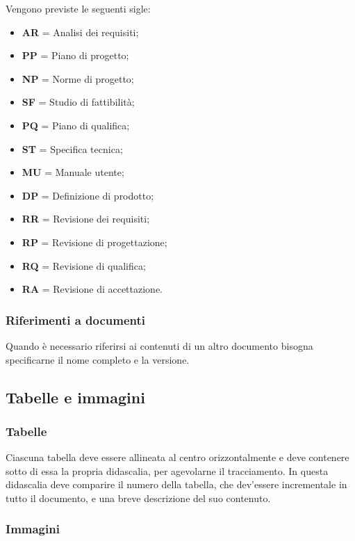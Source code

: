 	Vengono previste le seguenti sigle:
	
	\begin{itemize}

		\item \textbf{AR} = Analisi dei requisiti;
		\item \textbf{PP} = Piano di progetto;
		\item \textbf{NP} = Norme di progetto;
		\item \textbf{SF} = Studio di fattibilità;
		\item \textbf{PQ} = Piano di qualifica;
		\item \textbf{ST} = Specifica tecnica;
		\item \textbf{MU} = Manuale utente;
		\item \textbf{DP} = Definizione di prodotto;
		\item \textbf{RR} = Revisione dei requisiti;
		\item \textbf{RP} = Revisione di progettazione;
		\item \textbf{RQ} = Revisione di qualifica;
		\item \textbf{RA} = Revisione di accettazione.
	
	\end{itemize}
	
	\subsubsection{Riferimenti a documenti}
	
	Quando è necessario riferirsi ai contenuti di un altro documento bisogna specificarne il nome completo e la versione.
	
\subsection{Tabelle e immagini}

	\subsubsection{Tabelle}
	
	Ciascuna tabella deve essere allineata al centro orizzontalmente e deve contenere sotto di essa la propria didascalia, per agevolarne il tracciamento. In questa didascalia deve comparire il numero della tabella, che dev'essere incrementale in tutto il documento, e una breve descrizione del suo contenuto.
	
	\subsubsection{Immagini}
	
